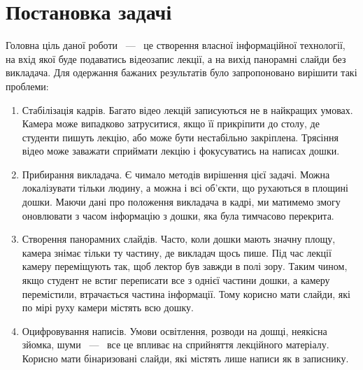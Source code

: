 \section{Постановка задачі}

Головна ціль даної роботи ~---~ це створення власної інформаційної технології,
на вхід якої буде подаватись відеозапис лекції, а на вихід панорамні слайди
без викладача.
Для одержання бажаних результатів було запропоновано
вирішити такі проблеми:
\begin{enumerate}
	\item
	      Стабілізація кадрів.
	      Багато відео лекцій записуються не в найкращих умовах.
	      Камера може випадково затруситися, якщо її прикріпити до столу,
	      де студенти пишуть лекцію, або може бути нестабільно закріплена.
          Трясіння відео може заважати сприймати лекцію і фокусуватись на написах дошки.
	\item
	      Прибирання викладача.
	      Є чимало методів вирішення цієї задачі. Можна локалізувати тільки
	      людину, а можна і всі об'єкти, що рухаються в площині дошки. Маючи
	      дані про положення викладача в кадрі, ми матимемо змогу оновлювати
	      з часом інформацію з дошки, яка була тимчасово перекрита.

	\item
	      Створення панорамних слайдів.
          Часто, коли дошки мають значну площу, камера знімає тільки ту частину, де
	      викладач щось пише. Під час лекції камеру переміщують так, щоб лектор був завжди
	      в полі зору. Таким чином, якщо студент не встиг переписати все з однієї частини
	      дошки, а камеру перемістили, втрачається частина інформації. Тому корисно
	      мати слайди, які по мірі руху камери містять всю дошку.

	\item
	      Оцифровування написів.
	      Умови освітлення, розводи на дошці, неякісна зйомка, шуми ~---~ все це впливає
          на сприйняття лекційного матеріалу. Корисно мати бінаризовані слайди,
          які містять лише написи як в записнику.
\end{enumerate}
